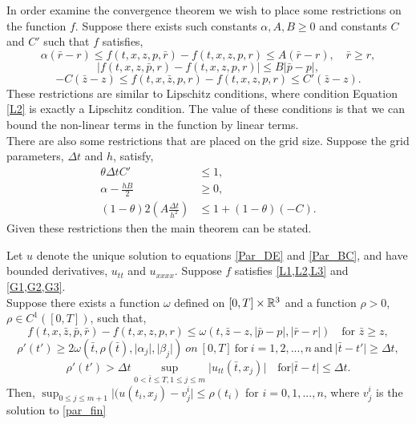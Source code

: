 In order examine the convergence theorem we wish to place some restrictions on the function $f$. 
Suppose there exists such constants $\alpha,A, B \geq 0$ and constants $C$ and $C'$ such that $f$ satisfies,
\begin{equation}
\alpha\left(\bar{r}-r\right)\leq f(t,x,z,p,\bar{r})-f(t,x,z,p,r)\leq A(\bar{r}-r), \quad \bar{r}\geq r,
\label{L1}
\end{equation}
\begin{equation}
\lvert f(t,x,z,\bar{p},r)-f(t,x,z,p,r)\rvert\leq B\lvert\bar{p}-p\rvert, \label{L2}
\end{equation}
\begin{equation}
-C\left(\bar{z}-z\right)\leq f(t,x,\bar{z},p,r)-f(t,x,z,p,r)\leq C'(\bar{z}-z). \label{L3}
\end{equation}
These restrictions are similar to Lipschitz conditions, where condition Equation \ref{L2} is exactly a Lipschitz condition. The value of these conditions is that we can bound the non-linear terms in the function by linear terms.\\
There are also some restrictions that are placed on the grid size.
Suppose the grid parameters, $\Delta t$ and $h$, satisfy,
\begin{align}
\theta \Delta tC'&\leq 1, \label{G1}\\
\alpha-\frac{hB}{2}&\geq 0,\label{G2}\\
\left(1-\theta\right)2\left(A\frac{\Delta t}{h^2}\right) &\leq 1+\left( 1-\theta\right)\left(-C\right)\label{G3}.
\end{align}
 Given these restrictions then the main theorem can be stated.

\begin{theorem}
\label{conv}
Let $u$ denote the unique solution to equations \ref{Par_DE} and \ref{Par_BC}, and have bounded derivatives, $u_{tt}$ and $u_{xxxx}$. Suppose $f$ satisfies \cref{L1,L2,L3} and \cref{G1,G2,G3}.\\ 
Suppose there exists a function $\omega$ defined on $[0,T]\times \mathbb{R}^3$ and a function $\rho >0$, $\rho\in C^1([0,T])$, such that,
\begin{equation}
f(t,x,\bar{z},\bar{p},\bar{r})-f(t,x,z,p,r)\leq \omega(t,\bar{z}-z,\lvert \bar{p}-p\rvert,\lvert \bar{r}-r\rvert) \quad \textrm{for } \bar{z}\geq z,
\end{equation}  
\begin{equation}
\rho'(t')\geq 2\omega(\bar{t},\rho(\bar{t}),\lvert \alpha_j\rvert,\lvert \beta_j\rvert) \ on \ [0,T] \ \mathrm{for} \ i=1,2,...,n \ \mathrm{and}\ \lvert \bar{t}-t'\rvert \geq \Delta t,
\end{equation}
\begin{equation}
\rho '(t')> \Delta t \sup_{0<\bar{t}\leq T,1\leq j\leq m} \lvert u_{tt}(\bar{t},x_j)\rvert \quad \mathrm{for} \lvert \bar{t}-t\rvert \leq \Delta t.
\end{equation}
Then, $\sup_{0\leq j \leq m+1}\lvert(u(t_i,x_j)-v^i_j\rvert \leq \rho(t_i)$ for $i=0,1,...,n$, where $v^i_j$ is the solution to \ref{par_fin}

\end{theorem}

